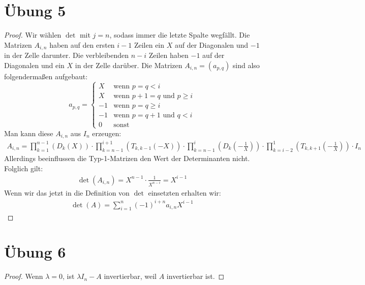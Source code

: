 \documentclass[a4paper,10pt]{article}
\begin{document}
\section*{Übung 5}

\begin{proof}
 Wir wählen $\det$ mit $j = n$, sodass immer die letzte Spalte wegfällt.
 Die Matrizen $A_{i,n}$ haben auf den ersten $i - 1$ Zeilen ein $X$ auf der Diagonalen und $-1$ in der Zelle darunter.
 Die verbleibenden $n - i$ Zeilen haben $-1$ auf der Diagonalen und ein $X$ in der Zelle darüber.
 Die Matrizen $A_{i,n} = (a_{p,q})$ sind also folgendermaßen aufgebaut:
 \begin{equation}
  a_{p,q} =
   \begin{cases}
    X & \text{wenn $p = q < i$}\\
    X & \text{wenn $p + 1 = q$ und $p \ge i$}\\
    -1 & \text{wenn $p = q \ge i$}\\
    -1 & \text{wenn $p = q + 1$ und $q < i$}\\
    0 & \text{sonst}
   \end{cases}
 \end{equation}
 Man kann diese $A_{i,n}$ aus $I_n$ erzeugen:
 \begin{align*}
  A_{i,n} = \prod_{k = 1}^{n - 1} \left( D_k(X) \right) \cdot \prod_{k = n - 1}^{i + 1} \left( T_{k, k - 1}(-X) \right) \cdot \prod_{k = n - 1}^{i} \left( D_k(-\frac{1}{X}) \right) \cdot \prod_{k = i - 2}^{1} \left( T_{k,k + 1}(-\frac{1}{X}) \right) \cdot I_n
 \end{align*}
 Allerdings beeinflussen die Typ-1-Matrizen den Wert der Determinanten nicht.
 Folglich gilt:
 \begin{align*}
  \det(A_{i,n}) = X^{n - 1} \cdot \frac{1}{X^{n - i}} = X^{i - 1}
 \end{align*}
 Wenn wir das jetzt in die Definition von $\det$ einsetzten erhalten wir:
 \begin{align*}
  \det(A) = \sum_{i = 1}^n (-1)^{i + n} a_{i,n} X^{i - 1}
 \end{align*}
\end{proof}

\section*{Übung 6}

\begin{proof}
 Wenn $\lambda = 0$, ist $\lambda I_n - A$ invertierbar, weil $A$ invertierbar ist.
 
 
\end{proof}
\end{document}
